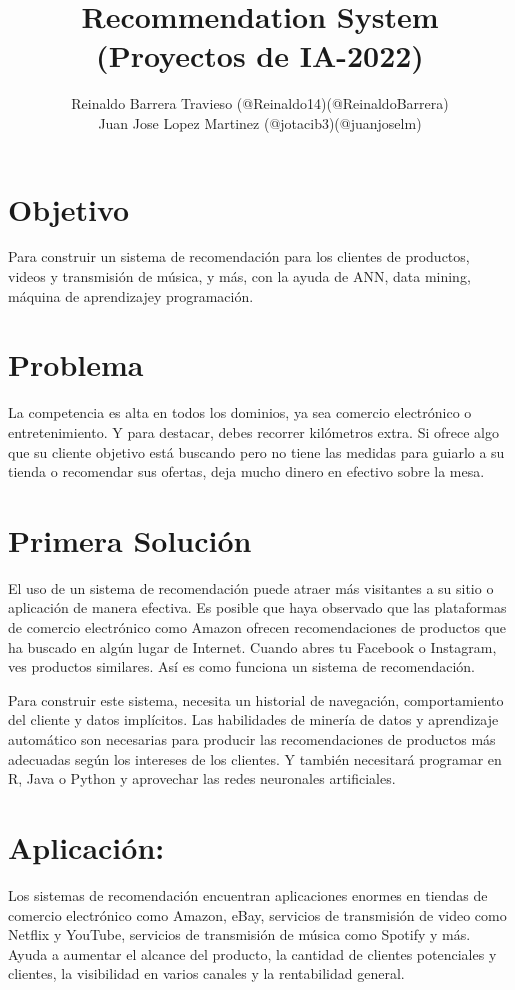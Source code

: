 \documentclass[12pt]{article}
\begin{document}
\title{Recommendation System (Proyectos de IA-2022)}
\author{
    Reinaldo Barrera Travieso (@Reinaldo14)(@ReinaldoBarrera)\\
    Juan Jose Lopez Martinez (@jotacib3)(@juanjoselm)
}
\date{}
\maketitle

\newpage

\section*{Objetivo}

Para construir un sistema de recomendación para los clientes de productos, videos y transmisión de música, y más, con la ayuda de ANN, data mining, máquina de aprendizajey programación.

\section*{Problema}

La competencia es alta en todos los dominios, ya sea comercio electrónico o entretenimiento. Y para destacar, debes recorrer kilómetros extra. Si ofrece algo que su cliente objetivo está buscando pero no tiene las medidas para guiarlo a su tienda o recomendar sus ofertas, deja mucho dinero en efectivo sobre la mesa.

\section*{Primera Solución}
El uso de un sistema de recomendación puede atraer más visitantes a su sitio o aplicación de manera efectiva. Es posible que haya observado que las plataformas de comercio electrónico como Amazon ofrecen recomendaciones de productos que ha buscado en algún lugar de Internet. Cuando abres tu Facebook o Instagram, ves productos similares. Así es como funciona un sistema de recomendación.

Para construir este sistema, necesita un historial de navegación, comportamiento del cliente y datos implícitos. Las habilidades de minería de datos y aprendizaje automático son necesarias para producir las recomendaciones de productos más adecuadas según los intereses de los clientes. Y también necesitará programar en R, Java o Python y aprovechar las redes neuronales artificiales.

\section*{Aplicación:}
Los sistemas de recomendación encuentran aplicaciones enormes en tiendas de comercio electrónico como Amazon, eBay, servicios de transmisión de video como Netflix y YouTube, servicios de transmisión de música como Spotify y más. Ayuda a aumentar el alcance del producto, la cantidad de clientes potenciales y clientes, la visibilidad en varios canales y la rentabilidad general.
\end{document}
